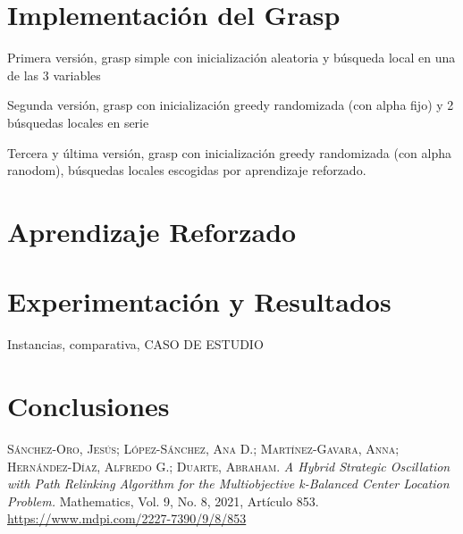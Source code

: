 \documentclass[12pt,a4paper]{book}
\begin{document}
\chapter{Implementación del Grasp}

Primera versión, grasp simple con inicialización aleatoria y búsqueda local en una de las 3 variables

Segunda versión, grasp con inicialización greedy randomizada (con alpha fijo) y 2 búsquedas locales en serie

Tercera y última versión, grasp con inicialización greedy randomizada (con alpha ranodom), búsquedas locales escogidas por aprendizaje reforzado.

\chapter{Aprendizaje Reforzado}

\chapter{Experimentación y Resultados}

Instancias, comparativa, CASO DE ESTUDIO

\chapter{Conclusiones}





\begin{thebibliography}{X}
     \textsc{Sánchez-Oro, Jesús; López-Sánchez, Ana D.; Martínez-Gavara, Anna; Hernández-Díaz, Alfredo G.; Duarte, Abraham}. \textit{A Hybrid Strategic Oscillation with Path Relinking Algorithm for the Multiobjective k-Balanced Center Location Problem.} Mathematics, Vol. 9, No. 8, 2021, Artículo 853. \url{https://www.mdpi.com/2227-7390/9/8/853}

\end{thebibliography}
\end{document}
